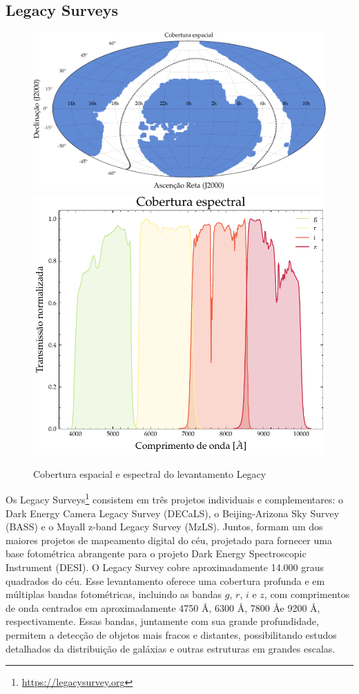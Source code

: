 \subsection{Legacy Surveys}
\label{sec:legacy}

\begin{figure}[!ht]
  \centering
  \caption{Cobertura espacial e espectral do levantamento Legacy}
  \label{fig:legacy}
  \includegraphics[width=0.61\linewidth]{notebooks/plots/footprint_legacy.pdf}\hfill
  \includegraphics[width=0.37\linewidth]{figures/transmission_legacy.pdf}
\end{figure}

Os Legacy Surveys\footnote{\url{https://legacysurvey.org}} \cite{legacy} consistem em três projetos individuais e complementares: o Dark Energy Camera Legacy Survey (DECaLS), o Beijing-Arizona Sky Survey (BASS) e o Mayall z-band Legacy Survey (MzLS). Juntos, formam um dos maiores projetos de mapeamento digital do céu, projetado para fornecer uma base fotométrica abrangente para o projeto Dark Energy Spectroscopic Instrument (DESI). O Legacy Survey cobre aproximadamente 14.000 graus quadrados do céu. Esse levantamento oferece uma cobertura profunda e em múltiplas bandas fotométricas, incluindo as bandas $g$, $r$, $i$ e $z$, com comprimentos de onda centrados em aproximadamente 4750 \AA, 6300 \AA, 7800 \AA e 9200 \AA, respectivamente. Essas bandas, juntamente com sua grande profundidade, permitem a detecção de objetos mais fracos e distantes, possibilitando estudos detalhados da distribuição de galáxias e outras estruturas em grandes escalas.

